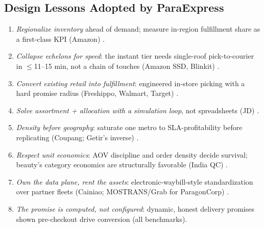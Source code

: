 \documentclass[journal]{IEEEtran}
\begin{document}
\subsection{Design Lessons Adopted by ParaExpress}
\begin{enumerate}[leftmargin=*, label=\textbf{L\arabic*.}]
  \item \emph{Regionalize inventory} ahead of demand; measure in-region fulfillment share as a first-class KPI (Amazon) \cite{amazonregional}.
  \item \emph{Collapse echelons for speed}: the instant tier needs single-roof pick-to-courier in ${\le}$11--15 min, not a chain of touches (Amazon SSD, Blinkit) \cite{costar,blinkit}.
  \item \emph{Convert existing retail into fulfillment}: engineered in-store picking with a hard promise radius (Freshippo, Walmart, Target) \cite{hema,walmart,target}.
  \item \emph{Solve assortment + allocation with a simulation loop}, not spreadsheets (JD) \cite{jdassort}.
  \item \emph{Density before geography}: saturate one metro to SLA-profitability before replicating (Coupang; Getir's inverse) \cite{coupang,getir}.
  \item \emph{Respect unit economics}: AOV discipline and order density decide survival; beauty's category economics are structurally favorable (India QC) \cite{indiaqc}.
  \item \emph{Own the data plane, rent the assets}: electronic-waybill-style standardization over partner fleets (Cainiao; MOSTRANS/Grab for ParagonCorp) \cite{cainiao,mostrans}.
  \item \emph{The promise is computed, not configured}: dynamic, honest delivery promises shown pre-checkout drive conversion (all benchmarks).
\end{enumerate}
\end{document}

